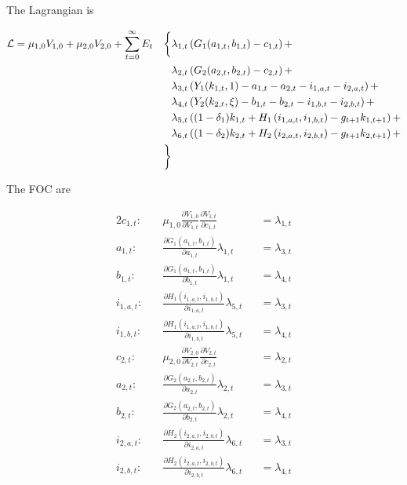 \documentclass[10pt]{article}
\newcommand{\fracpd}[2]{
  \ensuremath{\frac{\partial #1}{\partial #2}}
}
\begin{document}
The Lagrangian is

\begin{alignat}{2} \label{eq:lagrangian}
  \mathcal{L} &= \mu_{1,0} V_{1,0} + \mu_{2,0} V_{2,0} + \sum_{t=0}^{\infty} E_t & \biggm \{
  &\lambda_{1,t} \left( G_1(a_{1,t}, b_{1,t}) - c_{1,t} \right) + \notag \\
  & & &\lambda_{2,t} \left( G_2(a_{2,t}, b_{2,t}) - c_{2,t} \right) + \notag \\
  & & &\lambda_{3,t} \left( Y_1(k_{1,t},1) - a_{1,t} - a_{2,t} - i_{1,a,t} - i_{2,a,t} \right) + \notag \\
  & & &\lambda_{4,t} \left( Y_2(k_{2,t}, \xi) - b_{1,t} - b_{2,t} - i_{1,b,t} - i_{2,b,t} \right) + \notag \\
  & & &\lambda_{5,t} \left( (1-\delta_1)k_{1,t} + H_1 \left(i_{1,a,t}, i_{1,b,t} \right) - g_{t+1}k_{1,t+1} \right) + \notag \\
  & & &\lambda_{6,t} \left( (1-\delta_2)k_{2,t} + H_2 \left(i_{2,a,t}, i_{2,b,t} \right) - g_{t+1}k_{2,t+1} \right) + \notag \\
   && \biggm\}
\end{alignat}

The FOC are

\begin{alignat}{2}
  c_{1,t} : \quad   & \mu_{1,0} \fracpd{V_{1,0}}{V_{1,t}} \fracpd{V_{1,t}}{c_{1,t}} & &= \lambda_{1,t} \label{eq:c1} \\
  a_{1,t} : \quad   & \fracpd{G_1(a_{1,t}, b_{1,t})}{a_{1,t}} \lambda_{1,t} & &= \lambda_{3,t} \label{eq:a1} \\
  b_{1,t} : \quad   & \fracpd{G_1(a_{1,t}, b_{1,t})}{b_{1,t}} \lambda_{1,t} & &= \lambda_{4,t} \label{eq:b1} \\
  i_{1,a,t} : \quad & \fracpd{H_1(i_{1,a,t}, i_{1,b,t})}{i_{1,a,t}} \lambda_{5,t} & &= \lambda_{3,t} \label{eq:i1a} \\
  i_{1,b,t} : \quad & \fracpd{H_1(i_{1,a,t}, i_{1,b,t})}{i_{1,b,t}} \lambda_{5,t} & &= \lambda_{4,t} \label{eq:i1b} \\
  c_{2,t} : \quad   & \mu_{2,0} \fracpd{V_{2,0}}{V_{2,t}} \fracpd{V_{2,t}}{c_{2,t}}  & &= \lambda_{2,t} \label{eq:c2} \\
  a_{2,t} : \quad   & \fracpd{G_2(a_{2,t}, b_{2,t})}{a_{2,t}} \lambda_{2,t} & &= \lambda_{3,t} \label{eq:a2} \\
  b_{2,t} : \quad   & \fracpd{G_2(a_{2,t}, b_{2,t})}{b_{2,t}} \lambda_{2,t} & &= \lambda_{4,t} \label{eq:b2} \\
  i_{2,a,t} : \quad & \fracpd{H_2(i_{2,a,t}, i_{2,b,t})}{i_{2,a,t}} \lambda_{6,t} & &= \lambda_{3,t} \label{eq:i2a} \\
  i_{2,b,t} : \quad & \fracpd{H_2(i_{2,a,t}, i_{2,b,t})}{i_{2,b,t}} \lambda_{6,t} & &= \lambda_{4,t} \label{eq:i2b}
\end{alignat}
\end{document}
